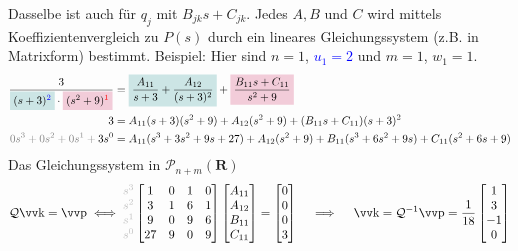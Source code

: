 Dasselbe ist auch f\"ur \(q_j\) mit \(B_{jk}s + C_{jk}\).
Jedes \(A, B\) und \(C\) wird mittels Koeffizientenvergleich zu \(P(s)\) durch
ein lineares Gleichungssystem (z.B. in Matrixform) bestimmt.
Beispiel: Hier sind
  \colorbox{teal!20}{\(n = 1\)},
  \textcolor{blue}{\(u_1 = 2\)} und
  \colorbox{purple!20}{\(m = 1\)},
  \textcolor{red!80!black}{\(w_1 = 1\)}.
\begin{align*}
  \frac{3}{
    \colorbox{teal!20}{\(
      (s + 3)^{\textcolor{blue}{2}}
    \)}
    \cdot
    \colorbox{purple!20}{\(
      (s^2 + 9)^{\textcolor{red}{1}}
    \)}
  }
  &=
  \colorbox{teal!20}{\(\displaystyle
    \frac{A_{11}}{s + 3} +
    \frac{A_{12}}{(s + 3)^2}
  \)}
  +
  \colorbox{purple!20}{\(\displaystyle
    \frac{B_{11} s + C_{11}}{s^2 + 9}
  \)}
  \\
  3 &= A_{11} (s + 3)(s^2 + 9) + A_{12} (s^2 + 9) + (B_{11} s + C_{11})(s + 3)^2 \\
  \begingroup\color{gray}0s^3 + 0s^2 + 0s^1 +\endgroup 3s^0 &=
    A_{11} (s^3 + 3s^2 + 9s + 27) +
    A_{12} (s^2 + 9) +
    B_{11} (s^3 + 6s^2 + 9s) +
    C_{11} (s^2 +6s + 9)
\end{align*}
Das Gleichungssystem in \(\mathcal{P}_{n+m}(\mathbf{R})\)
\[
  \mathcal{Q}\vec{k} = \vec{p} \iff
  \begingroup\color{lightgray}
    \begin{matrix}
      s^3 \\ s^2 \\ s^1 \\ s^0
    \end{matrix}
  \endgroup
  \begin{bmatrix}
     1 & 0 & 1 & 0 \\
     3 & 1 & 6 & 1 \\
     9 & 0 & 9 & 6 \\
    27 & 9 & 0 & 9 
  \end{bmatrix}
  \begin{bmatrix}
    A_{11} \\ A_{12} \\ B_{11} \\ C_{11}
  \end{bmatrix} =
  \begin{bmatrix}
    0 \\ 0 \\ 0 \\ 3
  \end{bmatrix}
  \quad\implies\quad
  \vec{k} = \mathcal{Q}^{-1} \vec{p} =
    \frac{1}{18}
    \begin{bmatrix}
      1 \\ 3 \\  -1 \\ 0
    \end{bmatrix}
\]
